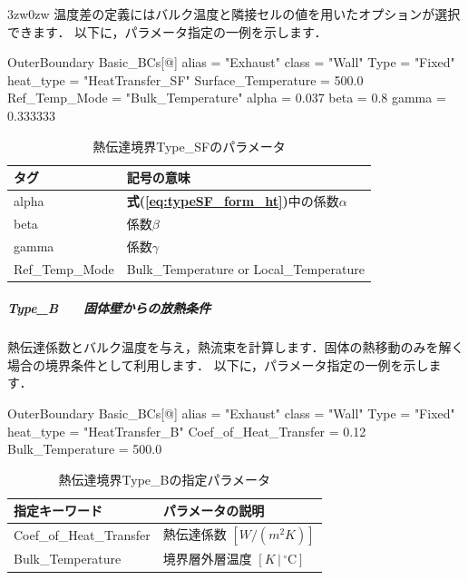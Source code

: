 \begin{indentation}{3zw}{0zw}
温度差の定義にはバルク温度と隣接セルの値を用いたオプションが選択できます．
以下に，パラメータ指定の一例を示します．

{\small
\begin{program}
OuterBoundary {
  Basic_BCs[@] {
    alias               = "Exhaust"
    class               = "Wall"
    Type                = "Fixed"
    heat_type           = "HeatTransfer_SF"
    Surface_Temperature = 500.0
    Ref_Temp_Mode       = "Bulk_Temperature"
    alpha               = 0.037
    beta                = 0.8
    gamma               = 0.333333
  }
}
\end{program}
}

\begin{table}[htdp]
\caption{熱伝達境界Type\_SFのパラメータ}
\begin{center}
\small
\begin{tabular}{ll}\toprule
タグ & 記号の意味\\ \midrule
alpha & \textbf{式(\ref{eq:typeSF_form_ht})}中の係数$\alpha$\\
beta & 係数$\beta$\\
gamma & 係数$\gamma$\\
Ref\_Temp\_Mode & Bulk\_Temperature or Local\_Temperature\\ \bottomrule
\end{tabular}
\end{center}
\label{tbl:htsf}
\end{table}


%
\subparagraph{Type\_B　　固体壁からの放熱条件}
熱伝達係数とバルク温度を与え，熱流束を計算します．固体の熱移動のみを解く場合の境界条件として利用します．
以下に，パラメータ指定の一例を示します．

{\small
\begin{program}
OuterBoundary {
  Basic_BCs[@] {
    alias                 = "Exhaust"
    class                 = "Wall"
    Type                  = "Fixed"
    heat_type             = "HeatTransfer_B"
    Coef_of_Heat_Transfer = 0.12
    Bulk_Temperature      = 500.0
  }
}
\end{program}
}

\begin{table}[htdp]
\caption{熱伝達境界Type\_Bの指定パラメータ}
\begin{center}
\small
\begin{tabular}{ll} \toprule
指定キーワード & パラメータの説明\\ \midrule
Coef\_of\_Heat\_Transfer & 熱伝達係数 $[W/(m^2K)]$\\
Bulk\_Temperature & 境界層外層温度 $[K\,|\,{}^\circ\mathrm{C}]$\\
\bottomrule
\end{tabular}
\end{center}
\label{tbl:htb}
\end{table}

\end{indentation}



